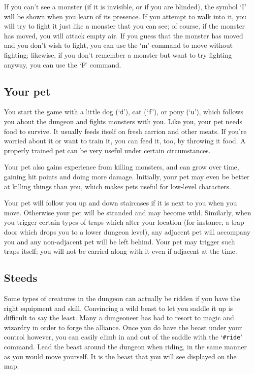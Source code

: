 If you can't see a monster (if it is invisible, or if you are blinded),
the symbol `I' will be shown when you learn of its presence.
If you attempt to walk into it, you will try to fight it just like
a monster that you can see; of course,
if the monster has moved, you will attack empty air.  If you guess
that the monster has moved and you don't wish to fight, you can use the `m'
command to move without fighting; likewise, if you don't remember a monster
but want to try fighting anyway, you can use the `F' command.

\subsection*{Your pet}

You start the game with a little dog (`{\tt d}'), cat (`{\tt f}'),
or pony (`{\tt u}'), which follows
you about the dungeon and fights monsters with you.  Like you, your
pet needs food to survive.  It usually feeds itself on fresh carrion
and other meats.  If you're worried about it or want to train it, you
can feed it, too, by throwing it food.  A properly trained pet can be
very useful under certain circumstances.

Your pet also gains experience from killing monsters, and can grow
over time, gaining hit points and doing more damage.  Initially, your
pet may even be better at killing things than you, which makes pets
useful for low-level characters.

Your pet will follow you up and down staircases if it is next to you
when you move.  Otherwise your pet will be stranded and may become
wild.  Similarly, when you trigger certain types of traps which alter
your location (for instance, a trap door which drops you to a lower
dungeon level), any adjacent pet will accompany you and any non-adjacent
pet will be left behind.  Your pet may trigger such traps itself; you
will not be carried along with it even if adjacent at the time.

\subsection*{Steeds}

Some types of creatures in the dungeon can actually be ridden if you
have the right equipment and skill.  Convincing a wild beast to let
you saddle it up is difficult to say the least.  Many a dungeoneer
has had to resort to magic and wizardry in order to forge the alliance.
Once you do have the beast under your control however, you can
easily climb in and out of the saddle with the `{\tt \#ride}' command.  Lead
the beast around the dungeon when riding, in the same manner as
you would move yourself.  It is the beast that you will see displayed
on the map.


